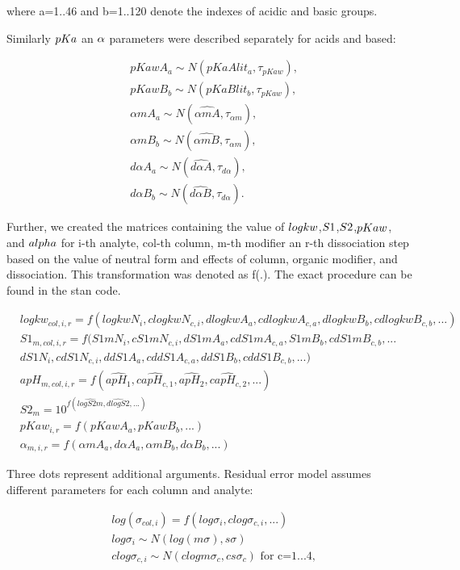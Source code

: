 \documentclass[
]{article}
\begin{document}
where a=1..46 and b=1..120 denote the indexes of acidic and basic
groups.

Similarly \(\small pKa\) an \(\small \alpha\) parameters were described
separately for acids and based:

\[
\begin{aligned}
& pKawA_{a} \sim N(pKaAlit_{a}, \tau_{pKaw}), \\
& pKawB_{b} \sim N(pKaBlit_{b}, \tau_{pKaw}), \\
& \alpha mA_{a} \sim N(\hat{\alpha m A},\tau_{\alpha m}), \\
& \alpha mB_{b} \sim N(\hat{\alpha m B},\tau_{\alpha m}), \\
& d\alpha A_{a} \sim N(\hat{d\alpha A},\tau_{d\alpha}), \\
& d\alpha B_{b} \sim N(\hat{d\alpha B},\tau_{d\alpha}).
\end{aligned}
\]

Further, we created the matrices containing the value of
\(\small logkw\),\(\small S1\),\(\small S2\),\(\small pKaw\), and
\(\small alpha\) for i-th analyte, col-th column, m-th modifier an r-th
dissociation step based on the value of neutral form and effects of
column, organic modifier, and dissociation. This transformation was
denoted as f(.). The exact procedure can be found in the stan code.

\[
\begin{aligned}
& logkw_{col,i,r}= f(logkwN_i,clogkwN_{c,i},dlogkwA_{a},cdlogkwA_{c,a}, dlogkwB_{b}, cdlogkwB_{c,b},...) \\
& S1_{m,col,i,r}  = f(S1mN_i,cS1mN_{c,i}, dS1mA_a, cdS1mA_{c,a}, S1mB_b, cdS1mB_{c,b}, ...\\
& dS1N_i, cdS1N_{c,i}, ddS1A_a, cddS1A_{c,a}, ddS1B_b, cddS1B_{c,b},...) \\
& apH_{m,col,i,r} = f(\hat{apH_1},\hat{capH_{c,1}},\hat{apH_2},\hat{capH_{c,2}},...) \\
& S2_{m} = 10^{f(\hat{logS2m},\hat{dlogS2},...)} \\
& pKaw_{i,r} = f(pKawA_{a},pKawB_{b},...) \\
& \alpha_{m,i,r} = f(\alpha mA_{a}, d\alpha A_{a}, \alpha mB_{b}, d\alpha B_{b},...)
\end{aligned}
\]

Three dots represent additional arguments. Residual error model assumes
different parameters for each column and analyte:

\[
\begin{aligned}
& log(\sigma_{col,i}) = f(log\sigma_i, clog\sigma_{c,i},...) \\
& log\sigma_i  \sim N(log(m\sigma),s\sigma) \\
& clog\sigma_{c,i} \sim N(clogm\sigma_c,cs\sigma_c) \text{ for c=1...4},
\end{aligned}
\]
\end{document}
